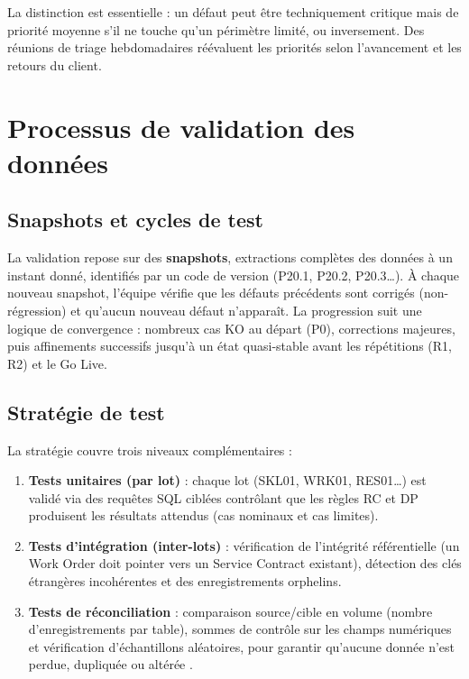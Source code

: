 La distinction est essentielle : un défaut peut être techniquement critique mais de priorité moyenne s'il ne touche qu'un périmètre limité, ou inversement. Des réunions de triage hebdomadaires réévaluent les priorités selon l'avancement et les retours du client.

\section{Processus de validation des données}
\label{sec:validation}

\subsection{Snapshots et cycles de test}
\label{subsec:snapshots}

La validation repose sur des \textbf{snapshots}, extractions complètes des données à un instant donné, identifiés par un code de version (P20.1, P20.2, P20.3\ldots). À chaque nouveau snapshot, l'équipe vérifie que les défauts précédents sont corrigés (non-régression) et qu'aucun nouveau défaut n'apparaît. La progression suit une logique de convergence : nombreux cas KO au départ (P0), corrections majeures, puis affinements successifs jusqu'à un état quasi-stable avant les répétitions (R1, R2) et le Go Live.

\subsection{Stratégie de test}
\label{subsec:strategie-test}

La stratégie couvre trois niveaux complémentaires \cite{datagaps2025,quinnox2025} :

\begin{enumerate}[leftmargin=*, label=\textbf{\arabic*.}]
    \item \textbf{Tests unitaires (par lot)} : chaque lot (SKL01, WRK01, RES01\ldots) est validé via des requêtes SQL ciblées contrôlant que les règles RC et DP produisent les résultats attendus (cas nominaux et cas limites).
    \item \textbf{Tests d'intégration (inter-lots)} : vérification de l'intégrité référentielle (un Work Order doit pointer vers un Service Contract existant), détection des clés étrangères incohérentes et des enregistrements orphelins.
    \item \textbf{Tests de réconciliation} : comparaison source/cible en volume (nombre d'enregistrements par table), sommes de contrôle sur les champs numériques et vérification d'échantillons aléatoires, pour garantir qu'aucune donnée n'est perdue, dupliquée ou altérée \cite{datafold2025}.
\end{enumerate}

